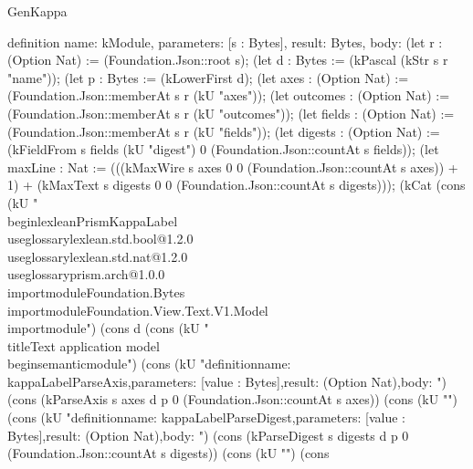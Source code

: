 \begin{lexlean}{GenKappa}
\begin{semanticmodule}
definition{
  name: kModule,
  parameters: [s : Bytes],
  result: Bytes,
  body: (let r : (Option Nat) := (Foundation.Json::root s); (let d : Bytes := (kPascal (kStr s r "name")); (let p : Bytes := (kLowerFirst d); (let axes : (Option Nat) := (Foundation.Json::memberAt s r (kU "axes")); (let outcomes : (Option Nat) := (Foundation.Json::memberAt s r (kU "outcomes")); (let fields : (Option Nat) := (Foundation.Json::memberAt s r (kU "fields")); (let digests : (Option Nat) := (kFieldFrom s fields (kU "digest") 0 (Foundation.Json::countAt s fields)); (let maxLine : Nat := (((kMaxWire s axes 0 0 (Foundation.Json::countAt s axes)) + 1) + (kMaxText s digests 0 0 (Foundation.Json::countAt s digests))); (kCat (cons (kU "\\begin{lexlean}{PrismKappaLabel}\n\\useglossary{lexlean.std.bool@1.2.0}\n\\useglossary{lexlean.std.nat@1.2.0}\n\\useglossary{prism.arch@1.0.0}\n\\importmodule{Foundation.Bytes}\n\\importmodule{Foundation.View.Text.V1.Model}\n\\importmodule{") (cons d (cons (kU "}\n\\title{Text application model}\n\\begin{semanticmodule}\n{}\n{}\n{}\n\n") (cons (kU "definition{\n  name: kappaLabelParseAxis,\n  parameters: [value : Bytes],\n  result: (Option Nat),\n  body: ") (cons (kParseAxis s axes d p 0 (Foundation.Json::countAt s axes)) (cons (kU "\n}\n\n") (cons (kU "definition{\n  name: kappaLabelParseDigest,\n  parameters: [value : Bytes],\n  result: (Option Nat),\n  body: ") (cons (kParseDigest s digests d p 0 (Foundation.Json::countAt s digests)) (cons (kU "\n}\n\n") (cons }
\end{semanticmodule}
\end{lexlean}
